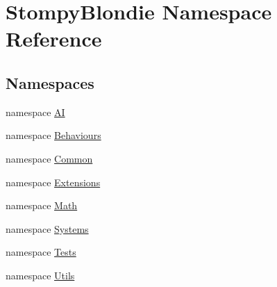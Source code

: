 \hypertarget{namespace_stompy_blondie}{}\section{Stompy\+Blondie Namespace Reference}
\label{namespace_stompy_blondie}
\subsection*{Namespaces}
\begin{DoxyCompactItemize}
\item 
namespace \mbox{\hyperlink{namespace_stompy_blondie_1_1_a_i}{AI}}
\item 
namespace \mbox{\hyperlink{namespace_stompy_blondie_1_1_behaviours}{Behaviours}}
\item 
namespace \mbox{\hyperlink{namespace_stompy_blondie_1_1_common}{Common}}
\item 
namespace \mbox{\hyperlink{namespace_stompy_blondie_1_1_extensions}{Extensions}}
\item 
namespace \mbox{\hyperlink{namespace_stompy_blondie_1_1_math}{Math}}
\item 
namespace \mbox{\hyperlink{namespace_stompy_blondie_1_1_systems}{Systems}}
\item 
namespace \mbox{\hyperlink{namespace_stompy_blondie_1_1_tests}{Tests}}
\item 
namespace \mbox{\hyperlink{namespace_stompy_blondie_1_1_utils}{Utils}}
\end{DoxyCompactItemize}

